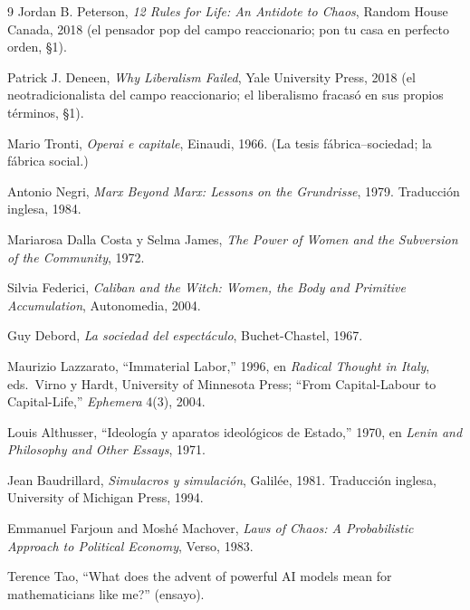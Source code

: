 \documentclass[11pt]{article}
\begin{document}
\begin{thebibliography}{9}
 Jordan B. Peterson, \textit{12 Rules for Life:
An Antidote to Chaos}, Random House Canada, 2018 (el pensador pop del
campo reaccionario; pon tu casa en perfecto orden, §1).

 Patrick J. Deneen, \textit{Why Liberalism
Failed}, Yale University Press, 2018 (el neotradicionalista del campo
reaccionario; el liberalismo fracasó en sus propios términos, §1).

 Mario Tronti, \textit{Operai e capitale}, Einaudi,
1966. (La tesis f\'abrica--sociedad; la f\'abrica social.)

 Antonio Negri, \textit{Marx Beyond Marx: Lessons on
the Grundrisse}, 1979. Traducci\'on inglesa, 1984.

 Mariarosa Dalla Costa y Selma James,
\textit{The Power of Women and the Subversion of the Community}, 1972.

 Silvia Federici, \textit{Caliban and the Witch:
Women, the Body and Primitive Accumulation}, Autonomedia, 2004.

 Guy Debord, \textit{La sociedad del espect\'aculo},
Buchet-Chastel, 1967.

 Maurizio Lazzarato, ``Immaterial Labor,'' 1996,
en \textit{Radical Thought in Italy}, eds.\ Virno y Hardt, University
of Minnesota Press; ``From Capital-Labour to Capital-Life,''
\textit{Ephemera} 4(3), 2004.

 Louis Althusser, ``Ideolog\'ia y aparatos
ideol\'ogicos de Estado,'' 1970, en \textit{Lenin and Philosophy and
Other Essays}, 1971.

 Jean Baudrillard, \textit{Simulacros y
simulaci\'on}, Galil\'ee, 1981. Traducci\'on inglesa, University of
Michigan Press, 1994.

 Emmanuel Farjoun and Mosh\'e Machover,
\textit{Laws of Chaos: A Probabilistic Approach to Political Economy},
Verso, 1983.

 Terence Tao, ``What does the advent of powerful AI models
mean for mathematicians like me?'' (ensayo).

\end{thebibliography}
\end{document}
